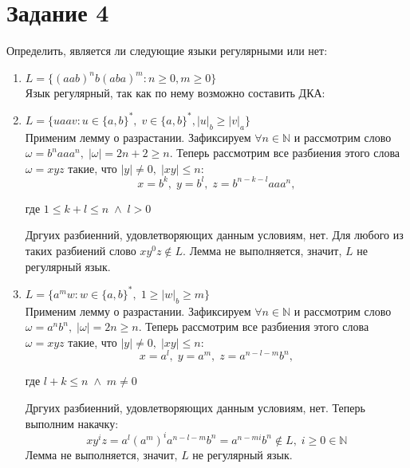 \documentclass{article}
\begin{document}
    \section*{Задание 4}
    Определить, является ли следующие языки регулярными или нет:\\

    \begin{enumerate}
        \item \(L=\{(aab)^{n}b(aba)^{m} : n \geqslant 0, m \geqslant 0\}\)\\
        Язык регулярный, так как по нему возможно составить ДКА:
        \begin{center}
        \end{center}
    
        \item \(L = \{uaav : u \in \{a, b\}^*, \; v \in \{a, b\}^*, |u|_b \geqslant |v|_a\}\)\\
        Применим лемму о разрастании. Зафиксируем \(\forall n \in \mathbb{N} \) и рассмотрим слово \(\omega = b^{n}aaa^{n}, \; |\omega| = 2n + 2 \geq n\). Теперь рассмотрим все разбиения этого слова \(\omega = xyz\) такие, что \(|y| \neq 0, \; |xy| \leq n\):
        $$x = b^{k}, \; y = b^{l}, \; z = b^{n - k - l}aaa^n,$$ \begin{center}
            где \(1 \leq k + l \leq n \; \wedge \; l > 0\)
        \end{center} 
        Дргуих разбиенний, удовлетворяющих данным условиям, нет.
        Для любого из таких разбиений слово \(xy^0z \notin L\). Лемма не выполняется, значит, \(L\) не регулярный язык.
        
        \item \(L = \{a^mw : w \in \{a, b\}^{*}, \; 1 \geqslant |w|_b \geqslant m\}\)\\
        Применим лемму о разрастании. Зафиксируем \(\forall n \in \mathbb{N} \) и рассмотрим слово \(\omega = a^nb^n, \; |\omega| = 2n \geqslant n\). Теперь рассмотрим все разбиения этого слова \(\omega = xyz\) такие, что \(|y| \neq 0, \; |xy| \leq n\):
        $$x = a^{l}, \; y = a^{m}, \; z = a^{n-l-m}b^{n},$$ 
        \begin{center}
            где \(l + k \leqslant n \; \wedge \; m \ne 0\)
        \end{center} 
        Дргуих разбиенний, удовлетворяющих данным условиям, нет. Теперь выполним накачку: 
        $$xy^{i}z = a^{l}(a^{m})^{i}a^{n-l-m}b^{n} = a^{n-mi}b^{n} \notin L, \; i 
        \geqslant 0 \in \mathbb{N} $$
        Лемма не выполняется, значит, \(L\) не регулярный язык.
        

\end{enumerate}
\end{document}
